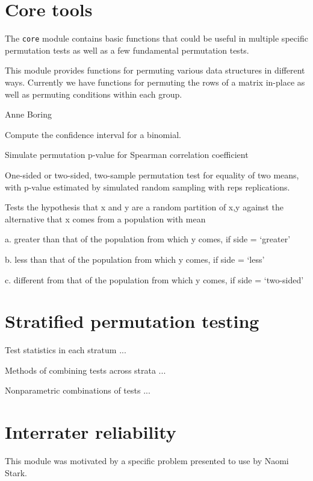\section{Core tools}

The \texttt{core} module contains basic functions that could be useful in
multiple specific permutation tests as well as a few fundamental
permutation tests.  

This module provides functions for permuting various data structures in
different ways.  Currently we have functions for permuting the rows of
a matrix in-place as well as permuting conditions within each group.

Anne Boring


Compute the confidence interval for a binomial.


Simulate permutation p-value for Spearman correlation coefficient


One-sided or two-sided, two-sample permutation test for equality of two means,
with p-value estimated by simulated random sampling with reps replications.

Tests the hypothesis that x and y are a random partition of x,y against the
alternative that x comes from a population with mean

a. greater than that of the population from which y comes, if side = ‘greater’

b. less than that of the population from which y comes, if side = ‘less’

c. different from that of the population from which y comes, if side = ‘two-sided’

\section{Stratified permutation testing}

Test statistics in each stratum ...

Methods of combining tests across strata ...

Nonparametric combinations of tests ...

\section{\label{sec:irr}Interrater reliability}

This module was motivated by a specific problem presented to use by
Naomi Stark.
%


